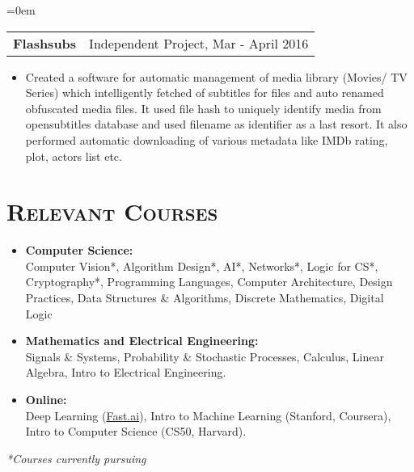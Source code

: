 \documentclass{article}
\makeatletter
\newenvironment{longversion}{}{} %
\newcommand{\headerrow}[2]
{\begin{tabular*}{\linewidth}{l@{\extracolsep{\fill}}r}
	#1 &
	#2 \\
\end{tabular*}}
\newcommand{\tmpsection}[1]{}
\let\tmpsection=\section
\renewcommand{\section}[1]{\tmpsection*{\textsc{#1}}}
\makeatother
\begin{document}
\begin{longversion}
\begin{list} {}{\leftmargin=0em}
\item[]
\headerrow {\textbf{Flashsubs}} {Independent Project, Mar - April 2016}
\begin{itemize} \item[]
Created a software for automatic management of media library (Movies/ TV Series) which intelligently fetched of subtitles for files and auto renamed obfuscated media files. It used file hash to uniquely identify media from opensubtitles database and used filename as identifier as a last resort. It also performed automatic downloading of various metadata like IMDb rating, plot, actors list etc.
\end{itemize}

\end{list}


\end{longversion}

\begin{longversion}
\section{Relevant Courses}
\begin{itemize}
\setlength\itemsep{-1em}
\item \textbf{Computer Science:} \\ 
Computer Vision*, Algorithm Design*, AI*, Networks*, Logic for CS*, Cryptography*, Programming Languages, Computer Architecture, Design Practices, Data Structures \& Algorithms, Discrete Mathematics, Digital Logic\\

\item \textbf{Mathematics and Electrical Engineering:} \\
Signals \& Systems, Probability \& Stochastic Processes, Calculus, Linear Algebra, Intro to Electrical Engineering.\\

\item \textbf{Online:} \\
Deep Learning (\href{http://www.fast.ai/}{Fast.ai}), Intro to Machine Learning (Stanford, Coursera), Intro to Computer Science (CS50, Harvard).


\end{itemize}



\textit{*Courses currently pursuing}
\end{longversion}
\end{document}
